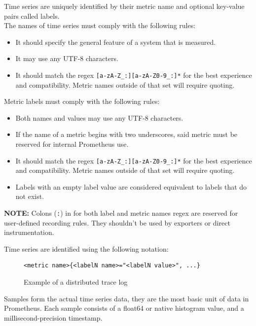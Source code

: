 Time series are uniquely identified by their metric name and optional key-value pairs called labels.\\
The names of time series must comply with the following rules:

\begin{itemize}
    \item It should specify the general feature of a system that is measured.
    \item It may use any UTF-8 characters.
    \item It should match the regex \texttt{[a-zA-Z\_:][a-zA-Z0-9\_:]*} for the best experience and
    compatibility.
    Metric names outside of that set will require quoting.
\end{itemize}

Metric labels must comply with the following rules:

\begin{itemize}
    \item Both names and values may use any UTF-8 characters.
    \item If the name of a metric begins with two underscores, said metric must be reserved for internal
    Prometheus use.
    \item It should match the regex \texttt{[a-zA-Z\_:][a-zA-Z0-9\_:]*} for the best experience and
    compatibility.
    Metric names outside of that set will require quoting.
    \item Labels with an empty label value are considered equivalent to labels that do not exist.
\end{itemize}


\medskip
\noindent
\textbf{NOTE:} Colons (\texttt{:}) in for both label and metric names regex are reserved for user-defined recording
rules.
They shouldn't be used by exporters or direct instrumentation.

Time series are identified using the following notation:
\begin{figure}[h]
    \centering
    \begin{lstlisting}
<metric name>{<labelN name>="<labelN value>", ...}
    \end{lstlisting}
    \caption{Example of a distributed trace log}
\end{figure}

Samples form the actual time series data, they are the most basic unit of data in Prometheus.
Each sample consists of a float64 or native histogram value, and a millisecond-precision timestamp.\\

